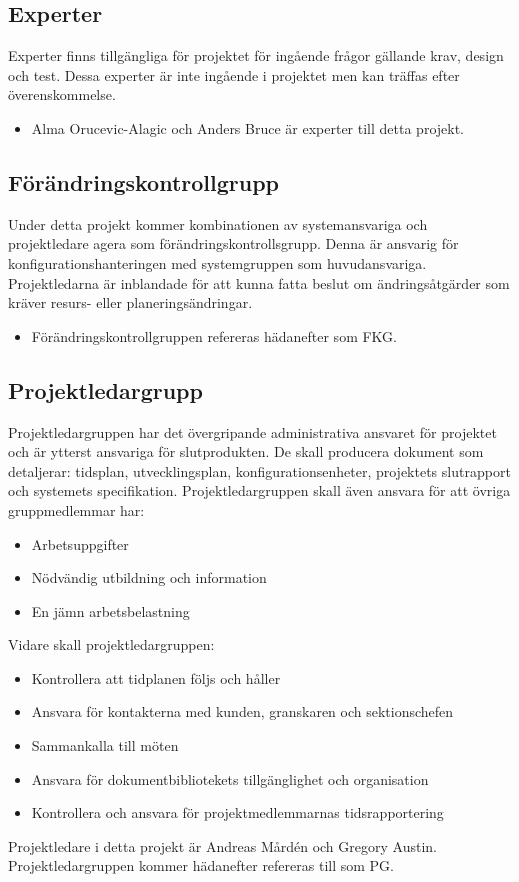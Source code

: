\documentclass[paper=a4, fontsize=11pt,twoside]{article}
\begin{document}
	 
\subsection*{Experter}
Experter finns tillgängliga för projektet för ingående frågor gällande krav, design och test. Dessa experter är inte ingående i projektet men kan träffas efter överenskommelse.
\begin{itemize}
\item Alma Orucevic-Alagic och Anders Bruce är experter till detta projekt.
\end{itemize}
	

\subsection*{Förändringskontrollgrupp}
Under detta projekt kommer kombinationen av systemansvariga och projektledare agera som förändringskontrollsgrupp. Denna är ansvarig för konfigurationshanteringen med systemgruppen som huvudansvariga. Projektledarna är inblandade för att kunna fatta beslut om ändringsåtgärder som kräver resurs- eller planeringsändringar.
\begin{itemize}
\item Förändringskontrollgruppen refereras hädanefter som FKG. 
\end{itemize}
		
\subsection*{Projektledargrupp}
Projektledargruppen har det övergripande administrativa ansvaret för projektet och är ytterst ansvariga för slutprodukten. De skall producera dokument som detaljerar: tidsplan, utvecklingsplan, konfigurationsenheter, projektets slutrapport och systemets specifikation.
Projektledargruppen skall även ansvara för att övriga gruppmedlemmar har:
\begin{itemize}
\item Arbetsuppgifter
\item Nödvändig utbildning och  information
\item En jämn arbetsbelastning
\end{itemize}
Vidare skall projektledargruppen:	
\begin{itemize}	 
\item Kontrollera att tidplanen följs och håller
\item Ansvara för kontakterna med kunden, granskaren och sektionschefen
\item Sammankalla till möten
\item Ansvara för dokumentbibliotekets tillgänglighet och organisation
\item Kontrollera och ansvara för projektmedlemmarnas tidsrapportering
\end{itemize}
Projektledare i detta projekt är Andreas Mårdén och Gregory Austin.	
Projektledargruppen kommer hädanefter refereras till som PG.
\end{document}

